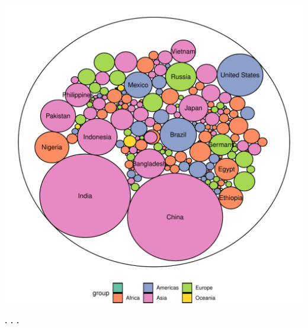 \documentclass{article}\usepackage[]{graphicx}\usepackage[]{color}
\makeatletter
\def\maxwidth{ %
  \ifdim\Gin@nat@width>\linewidth
    \linewidth
  \else
    \Gin@nat@width
  \fi
}
\newenvironment{knitrout}{}{} %
\makeatother
\begin{document}
\begin{knitrout}
\color{fgcolor}

{\centering \includegraphics[width=\maxwidth]{figure/plotgg_bu-1} 

}



\end{knitrout}
\begin{center}
\textbf{. . .}
\end{center}
\end{document}
